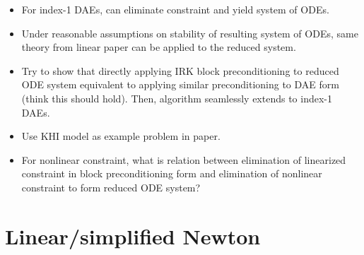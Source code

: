 \documentclass[a4paper,10pt]{article}
\begin{document}
\begin{itemize}
	\item For index-1 DAEs, can eliminate constraint and yield system of ODEs. 
	\item Under reasonable assumptions on stability of resulting system of ODEs,
	same theory from linear paper can be applied to the reduced system.
	\item Try to show that directly applying IRK block preconditioning to reduced
	ODE system equivalent to applying similar preconditioning to DAE form (think
	this should hold). Then, algorithm seamlessly extends to index-1 DAEs.
	\item Use KHI model as example problem in paper.

	\item For nonlinear constraint, what is relation between elimination of
	linearized constraint in block preconditioning form and elimination of
	nonlinear constraint to form reduced ODE system? 

\end{itemize}




\section{Linear/simplified Newton}
\end{document}
